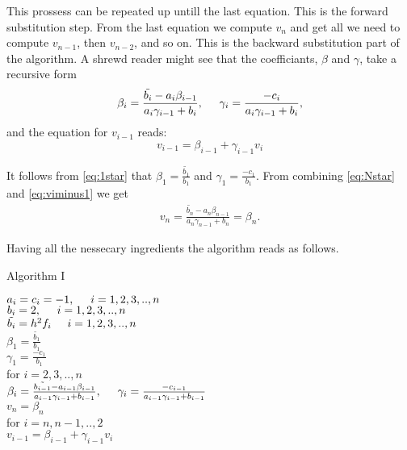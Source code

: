 \documentclass[11pt,a4paper,english,draft]{article}
\numberwithin{equation}{section}
\begin{document}
This prossess can be repeated up untill the last equation. 
This is the forward substitution step. 
From the last equation we compute $v_n$ and get all we need to compute $v_{n-1}$,
then $v_{n-2}$, and so on. This is the backward substitution part of the algorithm. A shrewd reader might see that the coefficiants, $\beta$ and $\gamma$, take a recursive form
\begin{align*}
\beta_{i} = \frac{\tilde{b_i}-a_i \beta_{i-1}}{a_i \gamma_{i-1} + b_i} , \hspace{0.5cm} \gamma_{i}=\frac{-c_i}{a_i \gamma_{i-1} + b_i},
\end{align*}
and the equation for $v_{i-1}$ reads: 
\begin{equation}
v_{i-1} = \beta_{i-1} + \gamma_{i-1} v_i
\label{eq:viminus1}
\end{equation}

It follows from \eqref{eq:1star} that $\beta_1 = \frac{\tilde{b_1}}{b_1}$ and $\gamma_1 = \frac{-c_1}{b_1}$.
From combining \eqref{eq:Nstar} and \eqref{eq:viminus1} we get 
\begin{align*}
v_n = \frac{\tilde{b_n}-a_n \beta_{n-1}}{a_n \gamma_{n-1} + b_n} = \beta_{n}.
\end{align*}

Having all the nessecary ingredients the algorithm reads as follows.
\vspace{0.5cm}\\

\centerline{Algorithm I}
\begin{tcolorbox}
$a_i = c_i = -1, \hspace{0.5cm}  i=1,2,3,..,n$\\
$b_i = 2, \hspace{0.5cm}  i=1,2,3,..,n $\\
$\tilde{b_i} = h^2 f_i \hspace{0.5cm}  i=1,2,3,..,n $\\
$\beta_1 = \frac{\tilde{b_1}}{b_1}$ \\
$\gamma_1 = \frac{-c_1}{b_1}$ \\
for $i=2,3,..,n$ \\ \vspace{0.5cm} 
 \hspace{0.5cm} $ \beta_{i} = \frac{\tilde{b_{i-1}}-a_{i-1} \beta_{i-1}}{a_{i-1} \gamma_{i-1} + b_{i-1}} , \hspace{0.5cm} \gamma_{i}=\frac{-c_{i-1}}{a_{i-1} \gamma_{i-1} + b_{i-1}} $ \vspace{0.2cm}  \\
 $v_{n} = \beta_{n}$\\
for $i=n, n-1,..,2$\\ \vspace{0.5cm} 
 \hspace{0.5cm} $v_{i-1} = \beta_{i-1} + \gamma_{i-1} v_i$

\end{tcolorbox} 
\end{document}
